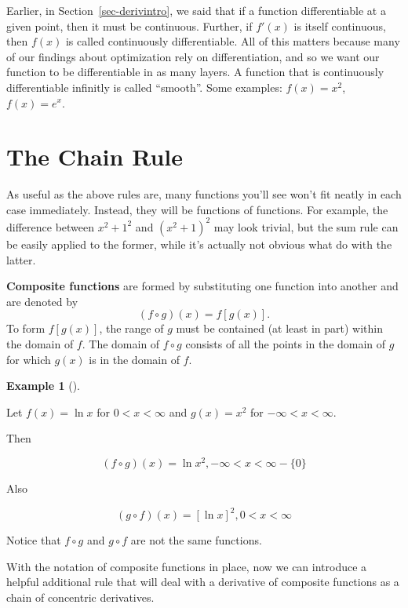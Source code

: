 \documentclass[
  letterpaper,
]{book}
\theoremstyle{definition}
\theoremstyle{definition}
\newtheorem{example}{Example}[chapter]
\theoremstyle{plain}
\theoremstyle{definition}
\theoremstyle{plain}
\theoremstyle{plain}
\theoremstyle{remark}
\begin{document}
Earlier, in Section~\ref{sec-derivintro}, we said that if a function
differentiable at a given point, then it must be continuous. Further, if
\(f'(x)\) is itself continuous, then \(f(x)\) is called continuously
differentiable. All of this matters because many of our findings about
optimization rely on differentiation, and so we want our function to be
differentiable in as many layers. A function that is continuously
differentiable infinitly is called ``smooth''. Some examples:
\(f(x) = x^2\), \(f(x) = e^x\).

\hypertarget{the-chain-rule}{%
\section{The Chain Rule}\label{the-chain-rule}}

As useful as the above rules are, many functions you'll see won't fit
neatly in each case immediately. Instead, they will be functions of
functions. For example, the difference between \(x^2 + 1^2\) and
\((x^2 + 1)^2\) may look trivial, but the sum rule can be easily applied
to the former, while it's actually not obvious what do with the latter.

\textbf{Composite functions} are formed by substituting one function
into another and are denoted by \[(f\circ g)(x)=f[g(x)].\] To form
\(f[g(x)]\), the range of \(g\) must be contained (at least in part)
within the domain of \(f\). The domain of \(f\circ g\) consists of all
the points in the domain of \(g\) for which \(g(x)\) is in the domain of
\(f\).

\leavevmode{}%
\begin{example}[]\label{exm-}

Let \(f(x)=\ln x\) for \(0<x<\infty\) and \(g(x)=x^2\) for
\(-\infty<x<\infty\).

Then

\[(f\circ g)(x)=\ln x^2, -\infty<x<\infty - \{0\}\]

Also

\[(g\circ f)(x)=[\ln x]^2, 0<x<\infty\]

Notice that \(f\circ g\) and \(g\circ f\) are not the same functions.

\end{example}

With the notation of composite functions in place, now we can introduce
a helpful additional rule that will deal with a derivative of composite
functions as a chain of concentric derivatives.
\end{document}
